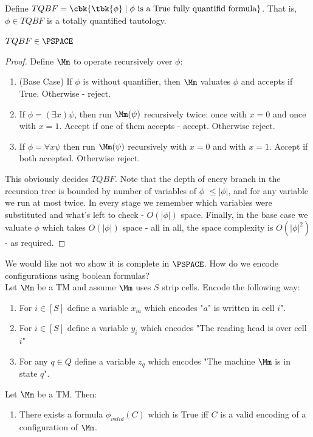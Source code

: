 \begin{example}
	Define $TQBF = \cbk{\tbk{\phi}\mid \phi\text{ is a True fully quantifid formula}}$. That is, $\phi\in TQBF$ is a totally quantified tautology.
	\begin{claim}
		$TQBF\in \PSPACE$
	\end{claim}
\begin{proof}
	Define $\Mm$ to operate recursively over $\phi$:\begin{enumerate}
		\item (Base Case) If $\phi$ is without quantifier, then $\Mm$ valuates $\phi$ and accepts if True. Otherwise - reject.
		\item If $\phi = (\exists x) \psi$, then run $\Mm(\psi)$ recursively twice: once with $x = 0$ and once with $x=1$. Accept if one of them accepts - accept. Otherwise reject.
		\item If $\phi = \forall x \psi$ then run $\Mm(\psi)$ recursively with $x=0$ and with $x=1$. Accept if both accepted. Otherwise reject.
	\end{enumerate}
This obviously decides $TQBF$. Note that the depth of enery branch in the recursion tree is bounded by number of variables of $\phi$ $\leq |\phi|$, and for any variable we run at most twice. In every stage we remember which variables were substituted and what's left to check - $O(|\phi|)$ space. Finally, in the base case we valuate $\phi$ which takes $O(|\phi|)$ space - all in all, the space complexity is $O(|\phi|^2)$ - as required.
\end{proof}
We would like not wo show it is complete in $\PSPACE$. How do we encode configurations using boolean formulas?\\
Let $\Mm$ be a TM and assume $\Mm$ uses $S$ strip cells. Encode the following way:
\begin{enumerate}
	\item For $i\in [S]$ define a variable $x_{ia}$ which encodes "$a$" is written in cell $i$".
	\item For $i\in [S]$ define a variable $y_i$ which encodes "The reading head is over cell $i$"
	\item For any $q\in Q$ define a variable $z_q$ which encodes "The machine $\Mm$ is in state $q$".
\end{enumerate}
\begin{blueBox}
	\begin{thm}
		Let $\Mm$ be a TM. Then:
		\begin{enumerate}
			\item There exists a formula $\phi_{valid}(C)$ which is True iff $C$ is a valid encoding of a configuration of $\Mm$.

\end{enumerate}
\end{thm}
\end{blueBox}
\end{example}
